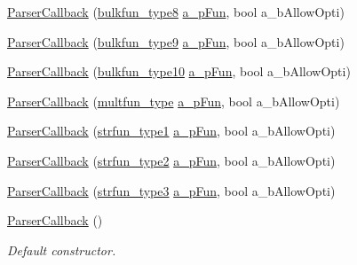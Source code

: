 \begin{DoxyCompactItemize}
\item 
\hyperlink{classmu_1_1_parser_callback_ad42ddac0efd2cce6e79715e156fa31b1}{Parser\+Callback} (\hyperlink{namespacemu_aa4e562060c2c2377266ec1cf274856fe}{bulkfun\+\_\+type8} \hyperlink{mu_parser_d_l_l_8h_ab3a3ed85edf393f2b8ad69081fe538e8}{a\+\_\+p\+Fun}, bool a\+\_\+b\+Allow\+Opti)
\item 
\hyperlink{classmu_1_1_parser_callback_a6fadf69565c3f7e295bc375eef298d89}{Parser\+Callback} (\hyperlink{namespacemu_a51c71d5698d29b40688feaa8e968efc9}{bulkfun\+\_\+type9} \hyperlink{mu_parser_d_l_l_8h_ab3a3ed85edf393f2b8ad69081fe538e8}{a\+\_\+p\+Fun}, bool a\+\_\+b\+Allow\+Opti)
\item 
\hyperlink{classmu_1_1_parser_callback_a07bc6bb899842448beffde1c9b18cd7b}{Parser\+Callback} (\hyperlink{namespacemu_aebd99bafbd17761a9e13b8a7366ae1ce}{bulkfun\+\_\+type10} \hyperlink{mu_parser_d_l_l_8h_ab3a3ed85edf393f2b8ad69081fe538e8}{a\+\_\+p\+Fun}, bool a\+\_\+b\+Allow\+Opti)
\item 
\hyperlink{classmu_1_1_parser_callback_afd7a7863138953853ad08c49cb781ca9}{Parser\+Callback} (\hyperlink{namespacemu_a004a9a10d015a8e2e17604cb632cd6c1}{multfun\+\_\+type} \hyperlink{mu_parser_d_l_l_8h_ab3a3ed85edf393f2b8ad69081fe538e8}{a\+\_\+p\+Fun}, bool a\+\_\+b\+Allow\+Opti)
\item 
\hyperlink{classmu_1_1_parser_callback_a027d02e29d93c0cfccc0a3780b59b9fb}{Parser\+Callback} (\hyperlink{namespacemu_a578b844842f577e78da3f520f9ee2f9a}{strfun\+\_\+type1} \hyperlink{mu_parser_d_l_l_8h_ab3a3ed85edf393f2b8ad69081fe538e8}{a\+\_\+p\+Fun}, bool a\+\_\+b\+Allow\+Opti)
\item 
\hyperlink{classmu_1_1_parser_callback_ae875518b280a457291178a204e538bcf}{Parser\+Callback} (\hyperlink{namespacemu_a14b9af8ec1e328b685221ca23fc9f765}{strfun\+\_\+type2} \hyperlink{mu_parser_d_l_l_8h_ab3a3ed85edf393f2b8ad69081fe538e8}{a\+\_\+p\+Fun}, bool a\+\_\+b\+Allow\+Opti)
\item 
\hyperlink{classmu_1_1_parser_callback_a5fcbcd39382aaa95b4bfd39c83f03be6}{Parser\+Callback} (\hyperlink{namespacemu_a1ce7a16b2a2b87f662819b7ee1d87bc0}{strfun\+\_\+type3} \hyperlink{mu_parser_d_l_l_8h_ab3a3ed85edf393f2b8ad69081fe538e8}{a\+\_\+p\+Fun}, bool a\+\_\+b\+Allow\+Opti)
\item 
\hyperlink{classmu_1_1_parser_callback_a2c460fd6954bfcb8416275cf660e5160}{Parser\+Callback} ()
\begin{DoxyCompactList}\small\item\em Default constructor. \end{DoxyCompactList}\item 

\end{DoxyCompactItemize}
